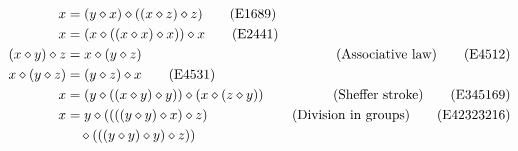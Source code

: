 \begin{align}
        x &= (y \diamond x) \diamond ((x \diamond z) \diamond z) \label{eq1689}\tag{E1689} \\
        x &= (x \diamond ((x \diamond x) \diamond x)) \diamond x \label{eq2441}\tag{E2441} \\
        (x \diamond y) \diamond z &= x \diamond (y \diamond z) &\hbox{(Associative law)} \label{eq4512}\tag{E4512}\\
        x \diamond (y \diamond z) &= (y \diamond z) \diamond x \label{eq4531}\tag{E4531} \\
        x &= (y \diamond ((x \diamond y) \diamond y)) \diamond (x \diamond (z \diamond y)) & \hbox{(Sheffer stroke)} \label{eq345169}\tag{E345169} \\
        x &= y \diamond ((((y \diamond y) \diamond x) \diamond z) & \hbox{(Division in groups)} \label{eq42323216}\tag{E42323216} \\
        & \quad  \diamond (((y \diamond y) \diamond y) \diamond z)) \nonumber
\end{align}
